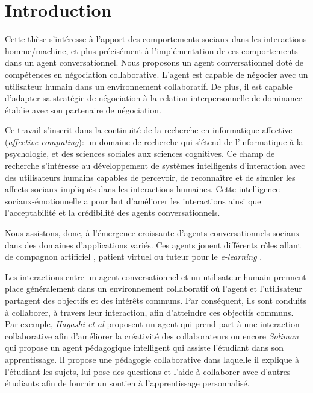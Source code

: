 \chapter{Introduction}


Cette thèse s'intéresse à l'apport des comportements sociaux dans les interactions homme/machine, et plus précisément à l'implémentation de ces comportements dans un agent conversationnel. Nous proposons un agent conversationnel doté de compétences en négociation collaborative. L'agent est capable de négocier avec un utilisateur humain dans un environnement collaboratif. De plus, il est capable d'adapter sa stratégie de négociation à la relation interpersonnelle de dominance établie avec son partenaire de négociation. 

Ce travail s'inscrit dans la continuité de la recherche en informatique affective (\emph{affective computing}): un domaine de recherche qui s'étend de l'informatique à la psychologie, et des sciences sociales aux sciences cognitives. Ce champ de recherche s'intéresse au développement de systèmes intelligents d'interaction avec des utilisateurs humains capables de percevoir, de reconnaître et de simuler les affects sociaux impliqués dans les interactions humaines. Cette intelligence sociaux-émotionnelle a pour but d'améliorer les interactions ainsi que l'acceptabilité et la crédibilité des agents conversationnels. 

Nous assistons, donc, à l'émergence croissante d'agents conversationnels sociaux dans des domaines d'applications variés.  Ces agents jouent différents rôles allant de compagnon artificiel \cite{ring2013addressing,sidner2013always}, patient virtuel \cite{kenny2007virtual,kleinheksel2017virtual} ou tuteur pour le \emph{e-learning}  \cite{kerly2008calmsystem,kerry2009conversational}.

Les interactions entre un agent conversationnel et un utilisateur humain prennent place généralement dans un environnement collaboratif où l'agent et l'utilisateur partagent des objectifs et des intérêts communs. 
Par conséquent, ils sont conduits à collaborer, à travers leur interaction, afin d'atteindre ces objectifs communs. 
Par exemple, \emph{Hayashi et al} proposent un agent qui prend part à une interaction collaborative afin d'améliorer la créativité des collaborateurs \cite{hayashi2013embodied} ou encore \emph{Soliman} \cite{soliman2010intelligent} qui propose un agent pédagogique intelligent qui assiste  l'étudiant dans son apprentissage. Il propose une pédagogie collaborative dans laquelle il explique à l'étudiant les sujets, lui pose des questions et l'aide à collaborer avec d'autres étudiants afin de fournir un soutien à l'apprentissage personnalisé.

